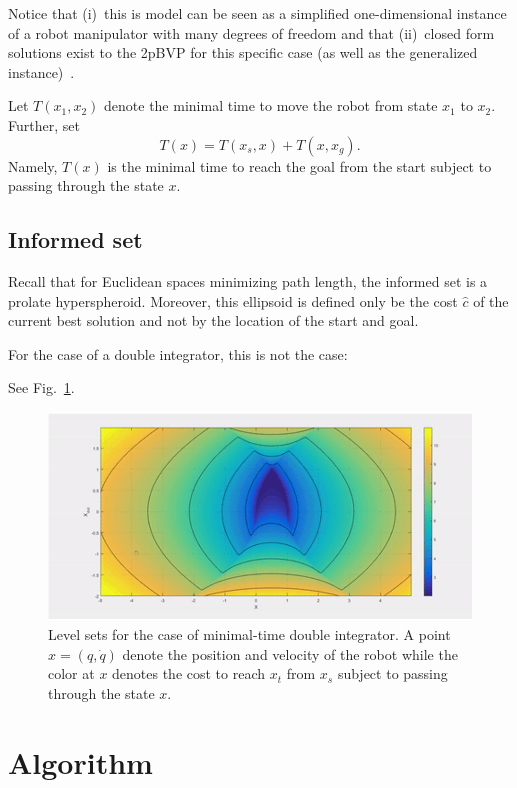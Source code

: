\documentclass[letterpaper, 10 pt, conference]{ieeeconf}  %
\begin{document}
Notice that 
(i)~this is model can be seen as a simplified one-dimensional instance of a robot manipulator with many degrees of freedom and that
(ii)~closed form solutions exist to the 2pBVP for this specific case (as well as the generalized instance)~\cite{HN10}.

Let $T(x_1, x_2)$ denote the minimal time to move the robot from state $x_1$ to $x_2$.
Further, set
$$
T(x) = T(x_s, x) + T(x, x_g).
$$ 
Namely, $T(x)$ is the minimal time to reach the goal from the start subject to passing through the state $x$.

\subsection{Informed set}
Recall that for Euclidean spaces minimizing path length, the informed set is a prolate hyperspheroid.
Moreover, this ellipsoid is defined only be the cost $\hat{c}$ of the current best solution and not by the location of the start and goal.

For the case of a double integrator, this is not the case:

See Fig.~\ref{fig:informed_1d_di}.
\begin{figure}[tb]
  \centering
  	\includegraphics[height = 4.cm ]{level_set.jpg}
  \caption{
    \captionstyle
  	Level sets for the case of minimal-time double integrator. A point $x = (q, \dot{q})$  denote the position and velocity of the robot while the color at $x$ denotes the cost to reach $x_t$ from $x_s$ subject to passing through the state $x$.
  	}
   	\label{fig:informed_1d_di}
	\vspace{-5.5mm}
\end{figure}


\section{Algorithm}
\label{sec:algorithm}
\end{document}
